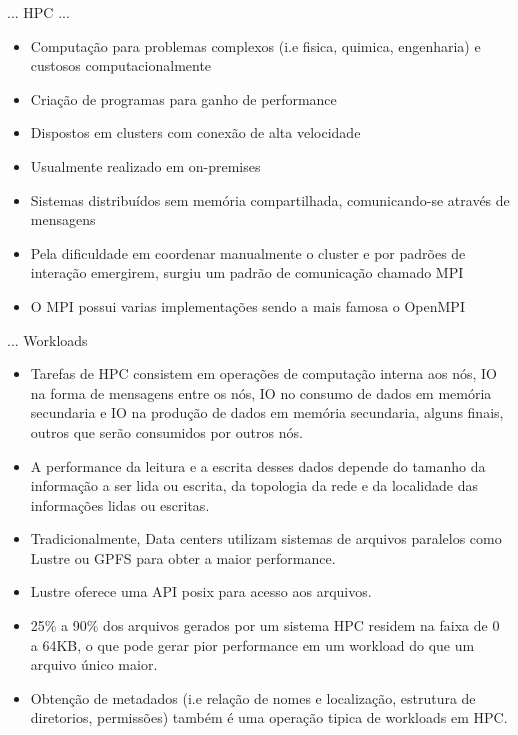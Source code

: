 \documentclass{beamer}
\begin{document}
\begin{frame}{... HPC ...}
	\begin{itemize}
		\item Computação para problemas complexos (i.e fisica, quimica, engenharia) e custosos computacionalmente
		\pause
		\item Criação de programas para ganho de performance
		\pause
		\item Dispostos em clusters com conexão de alta velocidade
		\pause
		\item Usualmente realizado em on-premises
		\item Sistemas distribuídos sem memória compartilhada, comunicando-se através de mensagens
		\pause
		\item Pela dificuldade em coordenar manualmente o cluster e por padrões de interação emergirem, surgiu um padrão de comunicação chamado MPI
		\pause
		\item O MPI possui varias implementações sendo a mais famosa o OpenMPI
	\end{itemize}
\end{frame}
\begin{frame}{... Workloads}
	\begin{itemize}
		\item Tarefas de HPC consistem em operações de computação interna aos nós, IO na forma de mensagens entre os nós, IO no consumo de dados em memória secundaria e IO na produção de dados em memória secundaria, alguns finais, outros que serão consumidos por outros nós.
		\pause
		\item A performance da leitura e a escrita desses dados depende do tamanho da informação a ser lida ou escrita, da topologia da rede e da localidade das informações lidas ou escritas.
		\pause
		\item Tradicionalmente, Data centers utilizam sistemas de arquivos paralelos como Lustre ou GPFS para obter a maior performance.
		\pause
		\item Lustre oferece uma API posix para acesso aos arquivos.
		\pause
		\item 25\% a 90\% dos arquivos gerados por um sistema HPC residem na faixa de 0 a 64KB, o que pode gerar pior performance em um workload do que um arquivo único maior.
		\pause
		\item Obtenção de metadados (i.e relação de nomes e localização, estrutura de diretorios, permissões) também é uma operação tipica de workloads em HPC.
	\end{itemize}
\end{frame}
\end{document}
